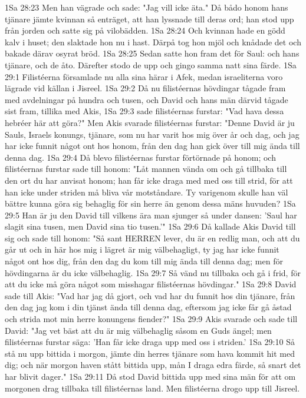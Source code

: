 1Sa 28:23  Men han vägrade och sade: "Jag vill icke äta." Då bådo honom hans tjänare jämte kvinnan så enträget, att han lyssnade till deras ord; han stod upp från jorden och satte sig på vilobädden.
1Sa 28:24  Och kvinnan hade en gödd kalv i huset; den slaktade hon nu i hast. Därpå tog hon mjöl och knådade det och bakade därav osyrat bröd.
1Sa 28:25  Sedan satte hon fram det för Saul: och hans tjänare, och de åto. Därefter stodo de upp och gingo samma natt sina färde.
1Sa 29:1  Filistéerna församlade nu alla sina härar i Afek, medan israeliterna voro lägrade vid källan i Jisreel.
1Sa 29:2  Då nu filistéernas hövdingar tågade fram med avdelningar på hundra och tusen, och David och hans män därvid tågade sist fram, tillika med Akis,
1Sa 29:3  sade filistéernas furstar: "Vad hava dessa hebréer här att göra?" Men Akis svarade filistéernas furstar: "Denne David är ju Sauls, Israels konungs, tjänare, som nu har varit hos mig över år och dag, och jag har icke funnit något ont hos honom, från den dag han gick över till mig ända till denna dag.
1Sa 29:4  Då blevo filistéernas furstar förtörnade på honom; och filistéernas furstar sade till honom: "Låt mannen vända om och gå tillbaka till den ort du har anvisat honom; han får icke draga med med oss till strid, för att han icke under striden må bliva vår motståndare. Ty varigenom skulle han väl bättre kunna göra sig behaglig för sin herre än genom dessa mäns huvuden?
1Sa 29:5  Han är ju den David till vilkens ära man sjunger så under dansen: 'Saul har slagit sina tusen, men David sina tio tusen.'"
1Sa 29:6  Då kallade Akis David till sig och sade till honom: "Så sant HERREN lever, du är en redlig man, och att du går ut och in här hos mig i lägret är mig välbehagligt, ty jag har icke funnit något ont hos dig, från den dag du kom till mig ända till denna dag; men för hövdingarna är du icke välbehaglig.
1Sa 29:7  Så vänd nu tillbaka och gå i frid, för att du icke må göra något som misshagar filistéernas hövdingar."
1Sa 29:8  David sade till Akis: "Vad har jag då gjort, och vad har du funnit hos din tjänare, från den dag jag kom i din tjänst ända till denna dag, eftersom jag icke får gå åstad och strida mot min herre konungens fiender?"
1Sa 29:9  Akis svarade och sade till David: "Jag vet bäst att du är mig välbehaglig såsom en Guds ängel; men filistéernas furstar säga: 'Han får icke draga upp med oss i striden.'
1Sa 29:10  Så stå nu upp bittida i morgon, jämte din herres tjänare som hava kommit hit med dig; och när morgon haven stått bittida upp, mån I draga edra färde, så snart det har blivit dager."
1Sa 29:11  Då stod David bittida upp med sina män för att om morgonen drag tillbaka till filistéernas land. Men filistéerna drogo upp till Jisreel.
